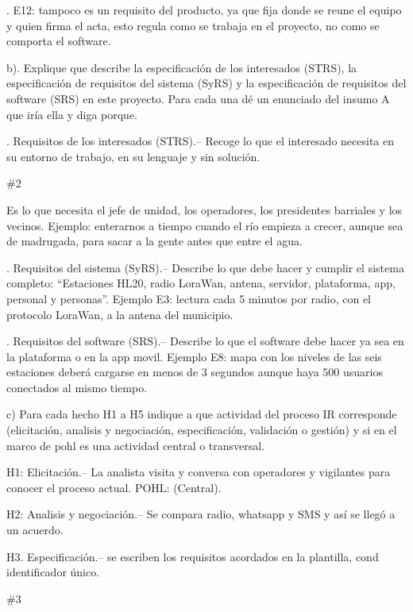 \documentclass[11pt,a4paper]{article}
\newcommand{\rojo}[1]{\textcolor{red!65!black}{#1}}
\begin{document}
. E12: tampoco es un requisito del producto, ya que fija donde se reune el equipo y quien firma el acta, esto regula como se trabaja en el proyecto, no como se comporta el software.

\rojo{b). Explique que describe la especificación de los interesados (STRS), la especificación de requisitos del sistema (SyRS) y la especificación de requisitos del software (SRS) en este proyecto. Para cada una dé un enunciado del insumo A que iría ella y diga porque.}

. Requisitos de los interesados (STRS).-- Recoge lo que el interesado necesita en su entorno de trabajo, en su lenguaje y sin solución.

\begin{flushright}\#2\end{flushright}

Es lo que necesita el jefe de unidad, los operadores, los presidentes barriales y los vecinos. Ejemplo: enterarnos a tiempo cuando el río empieza a crecer, aunque sea de madrugada, para sacar a la gente antes que entre el agua.

. Requisitos del sistema (SyRS).-- Describe lo que debe hacer y cumplir el sistema completo: “Estaciones HL20, radio LoraWan, antena, servidor, plataforma, app, personal y personas”. Ejemplo E3: lectura cada 5 minutos por radio, con el protocolo LoraWan, a la antena del municipio.

. Requisitos del software (SRS).-- Describe lo que el software debe hacer ya sea en la plataforma o en la app movil. Ejemplo E8: mapa con los niveles de las seis estaciones deberá cargarse en menos de 3 segundos aunque haya 500 usuarios conectados al mismo tiempo.

\rojo{c) Para cada hecho H1 a H5 indique a que actividad del proceso IR corresponde (elicitación, analisis y negociación, especificación, validación o gestión) y si en el marco de pohl es una actividad central o transversal.}

H1: Elicitación.-- La analista visita y conversa con operadores y vigilantes para conocer el proceso actual. POHL: (Central).

H2: Analisis y negociación.-- Se compara radio, whatsapp y SMS y así se llegó a un acuerdo.

H3. Especificación.-- se escriben los requisitos acordados en la plantilla, cond identificador único.

\begin{flushright}\#3\end{flushright}
\end{document}
